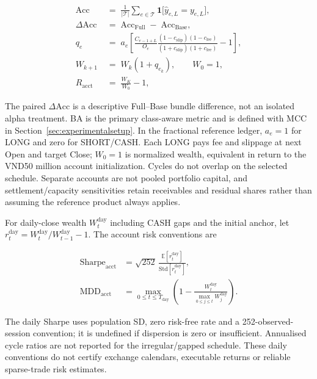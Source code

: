 \begin{align}
    \mathrm{Acc}
    &\;=\;
    \frac{1}{|\mathcal{T}|}
    \sum_{e \in \mathcal{T}}
    \mathbf{1}\!\bigl[\hat{y}_{e,L} = y_{e,L}\bigr],
    \label{eq:acc} \\[4pt]
    \Delta\mathrm{Acc}
    &\;=\;
    \mathrm{Acc}_{\mathrm{Full}}
    \;-\; \mathrm{Acc}_{\mathrm{Base}},
    \label{eq:lift} \\[4pt]
    q_e
    &\;=\;
    a_e\left[
    \frac{C_{e-1+L}}{O_e}
    \frac{(1-c_{\mathrm{slip}})(1-c_{\mathrm{fee}})}
         {(1+c_{\mathrm{slip}})(1+c_{\mathrm{fee}})}-1
    \right],
    \label{eq:execution_return}\\[4pt]
    W_{k+1}
    &\;=\;
    W_k\left(1+q_{e_k}\right),\qquad W_0=1,
    \label{eq:wealth_update}\\[4pt]
    R_{\mathrm{acct}}
    &\;=\;
    \frac{W_K}{W_0}-1,
    \label{eq:account_return}
\end{align}


The paired $\Delta\mathrm{Acc}$ is a descriptive Full--Base bundle difference, not an isolated alpha treatment. BA is the primary class-aware metric and is defined with MCC in Section~\ref{sec:experimentalsetup}. In the fractional reference ledger, $a_e=1$ for LONG and zero for SHORT/CASH. Each LONG pays fee and slippage at next Open and target Close; $W_0=1$ is normalized wealth, equivalent in return to the VND50 million account initialization. Cycles do not overlap on the selected schedule. Separate accounts are not pooled portfolio capital, and settlement/capacity sensitivities retain receivables and residual shares rather than assuming the reference product always applies.

For daily-close wealth $W^{\mathrm{day}}_t$ including CASH gaps and the initial anchor, let $r^{\mathrm{day}}_t=W^{\mathrm{day}}_t/W^{\mathrm{day}}_{t-1}-1$. The account risk conventions are

\begin{align}
    \mathrm{Sharpe}_{\mathrm{acct}}
    &=\sqrt{252}\,\frac{\mathbb{E}[r^{\mathrm{day}}_t]}
    {\mathrm{Std}[r^{\mathrm{day}}_t]},
    \label{eq:account_sharpe}\\[4pt]
    \mathrm{MDD}_{\mathrm{acct}}
    &=\max_{0\le t\le T_{\mathrm{day}}}
      \left(1-\frac{W^{\mathrm{day}}_t}{\max_{0\le j\le t}W^{\mathrm{day}}_j}\right).
    \label{eq:account_mdd}
\end{align}


The daily Sharpe uses population SD, zero risk-free rate and a 252-observed-session convention; it is undefined if dispersion is zero or insufficient. Annualised cycle ratios are not reported for the irregular/gapped schedule. These daily conventions do not certify exchange calendars, executable returns or reliable sparse-trade risk estimates.

